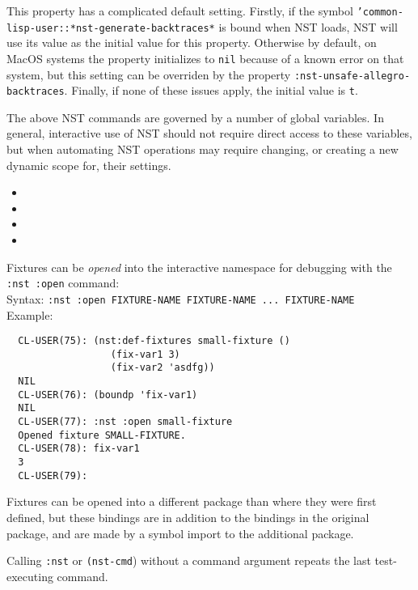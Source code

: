 \begin{itemize}
  This property has a complicated default setting.  Firstly, if the
  symbol \texttt{'common-lisp-user::*nst-generate-backtraces*} is
  bound when NST loads, NST will use its value as the initial value
  for this property.  Otherwise by default, on MacOS systems the
  property initializes to \texttt{nil} because of a known error on
  that system, but this setting can be overriden by the property
  \texttt{:nst-unsafe-allegro-backtraces}.  Finally, if none of these
  issues apply, the initial value is \texttt t.
\end{itemize}

The above NST commands are governed by a number of global variables.
In general, interactive use of NST should not require direct access to
these variables, but when automating NST operations may require
changing, or creating a new dynamic scope for, their settings.
\begin{itemize}
\item

\item

\item

\item

\end{itemize}

Fixtures can be \emph{opened} into the
interactive namespace for debugging with the
\texttt{:nst~:open} command:%
\\ Syntax: \texttt{:nst :open FIXTURE-NAME FIXTURE-NAME ... FIXTURE-NAME}
\\ Example:
\begin{verbatim}
  CL-USER(75): (nst:def-fixtures small-fixture ()
                  (fix-var1 3)
                  (fix-var2 'asdfg))
  NIL
  CL-USER(76): (boundp 'fix-var1)
  NIL
  CL-USER(77): :nst :open small-fixture
  Opened fixture SMALL-FIXTURE.
  CL-USER(78): fix-var1
  3
  CL-USER(79): 
\end{verbatim}
Fixtures can be opened into a different package than where they were
first defined, but these bindings are in addition to the bindings in
the original package, and are made by a symbol import to the
additional package.

Calling \texttt{:nst} or \texttt{(nst-cmd}) without a command argument
repeats the last test-executing command.

